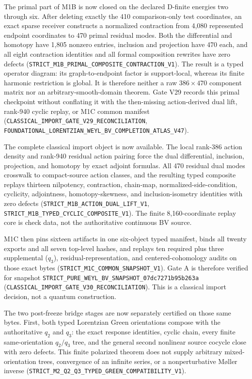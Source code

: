 \documentclass[11pt]{article}
\theoremstyle{definition}
\theoremstyle{remark}
\newcommand{\cert}[1]{\nolinkurl{#1}}
\begin{document}
The primal part of M1B is now closed on the declared D-finite energies two
through six.  After deleting exactly the 410 comparison-only test coordinates,
an exact sparse receiver constructs a normalized contraction from 4,080
represented endpoint coordinates to 470 primal residual modes.  Both the
differential and homotopy have 1,805 nonzero entries, inclusion and projection
have 470 each, and all eight contraction identities and all formal composition
rewrites have zero defects
(\cert{STRICT_M1B_PRIMAL_COMPOSITE_CONTRACTION_V1}).  The result is a typed
operator diagram: its graph-to-endpoint factor is support-local, whereas its
finite harmonic restriction is global.  It is therefore neither a raw
$386\mathbin{\times}470$ component matrix nor an arbitrary-smooth-domain
theorem.  Gate V29 records this primal checkpoint without conflating it with
the then-missing action-derived dual lift, rank-940 cyclic replay, or M1C
common manifest
(\cert{CLASSICAL_IMPORT_GATE_V29_RECONCILIATION},
\cert{FOUNDATIONAL_LORENTZIAN_WEYL_BV_COMPLETION_ATLAS_V47}).

The complete classical import object is now available.  The local rank-386
action density and rank-940 residual action pairing force the dual
differential, inclusion, projection, and homotopy by exact adjoint formulas.
All 470 residual dual modes crosswalk to compact-source action classes, and
the resulting typed composite replays thirteen nilpotency, contraction,
chain-map, normalized-side-condition, cyclicity, adjointness,
homotopy-skewness, and inclusion-isometry identities with zero defects
(\cert{STRICT_M1B_ACTION_DUAL_LIFT_V1},
\cert{STRICT_M1B_TYPED_CYCLIC_COMPOSITE_V1}).  The finite 8,160-coordinate
replay core is check data, not the authoritative continuous BV source.

M1C then pins sixteen artifacts in one six-object typed manifest, binds all
twenty exports and all seven top-level hashes, and replays ten required plus
three supplemental ($q_3$), residual-representation, and centered-cohomology
audits on those exact bytes
(\cert{STRICT_M1C_COMMON_SNAPSHOT_V1}).  Gate A is therefore verified for
snapshot
\cert{STRICT_PURE_WEYL_BV_SNAPSHOT_07dc7271b95b263a}
(\cert{CLASSICAL_IMPORT_GATE_V30_RECONCILIATION}).  This is a classical import
decision, not a quantum construction.

The two post-freeze bridge stages are now separately certified on those same
bytes.  First, both typed Lorentzian Green orientations compose with the
authoritative $q_2$ and $q_3$: the exact response identities, cyclic chain,
every finite same-orientation $q_2/q_3$ tree, and the general second nonlinear
source cocycle close with zero defects.  This finite polarized theorem does
not supply arbitrary mixed-orientation trees, convergence of an infinite
series, or a nonperturbative Møller inverse
(\cert{STRICT_M2_Q2_Q3_TYPED_GREEN_COMPATIBILITY_V1}).
\end{document}
